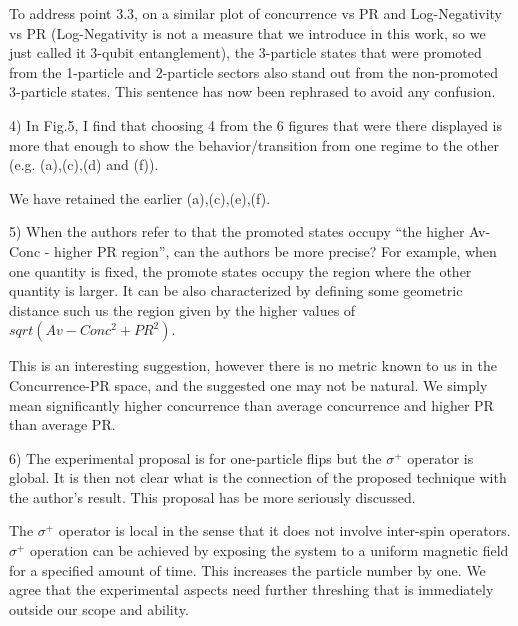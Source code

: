\documentclass[english]{letter}
\begin{document}
To address point 3.3, on a similar plot of concurrence vs PR and Log-Negativity vs PR (Log-Negativity is not a
measure that we introduce in this work, so we just called it 3-qubit entanglement), the 3-particle states that
were promoted from the 1-particle and 2-particle sectors also stand out from the non-promoted 3-particle states.
This sentence has now been rephrased to avoid any confusion.

\begin{shaded}
4) In Fig.5, I find that choosing 4 from the 6 figures that were there
displayed is more that enough to show the behavior/transition from one
regime to the other (e.g. (a),(c),(d) and (f)).
\end{shaded}
\noindent
We have retained the earlier (a),(c),(e),(f). 

\begin{shaded}
5) When the authors refer to that the promoted states occupy “the
higher Av-Conc - higher PR region”, can the authors be more precise?
For example, when one quantity is fixed, the promote states occupy the
region where the other quantity is larger. It can be also
characterized by defining some geometric distance such us the region
given by the higher values of $sqrt( Av-Conc^2 + PR^2)$.
\end{shaded}
\noindent
This is an interesting suggestion, however there is no metric known to us
 in the Concurrence-PR space, and the suggested one may not be natural. We simply mean
significantly higher concurrence than average concurrence and higher PR than average PR.

\begin{shaded}
6) The experimental proposal is for one-particle flips but the
$\sigma^{+}$ operator is global. It is then not clear what is the
connection of the proposed technique with the author’s result. This
proposal has be more seriously discussed.
\end{shaded}
\noindent 
The $\sigma^+$ operator is local in the sense that it does not involve inter-spin operators.
$\sigma^+$ operation can be achieved by exposing the system to a uniform magnetic field for a specified amount of time. This increases the particle number by one. We agree that the experimental aspects need further threshing that is immediately outside our scope and ability.
\end{document}
